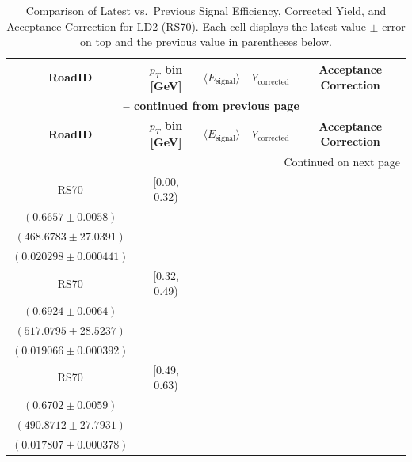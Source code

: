 {\footnotesize
\renewcommand{\arraystretch}{1.35}
\begin{longtable}{|c|c|c|c|c|}
\caption{Comparison of Latest vs.\ Previous Signal Efficiency, Corrected Yield, and Acceptance Correction for LD2 (RS70). Each cell displays the latest value $\pm$ error on top and the previous value in parentheses below.} \label{tab:eff_acc_comp_LD2_RS70} \\
\hline
\textbf{RoadID} & \textbf{$p_{T}$ bin [GeV]} & \textbf{$\langle E_{\mathrm{signal}} \rangle$} & \textbf{$Y_{\mathrm{corrected}}$} & \textbf{Acceptance Correction} \\
\hline
\endfirsthead
\multicolumn{5}{c}{{\bfseries \tablename\ \thetable{} -- continued from previous page}} \\
\hline
\textbf{RoadID} & \textbf{$p_{T}$ bin [GeV]} & \textbf{$\langle E_{\mathrm{signal}} \rangle$} & \textbf{$Y_{\mathrm{corrected}}$} & \textbf{Acceptance Correction} \\
\hline
\endhead
\hline \multicolumn{5}{|r|}{{Continued on next page}} \\ \hline
\endfoot
\hline
\endlastfoot
RS70 & [0.00, 0.32) & \begin{tabular}{@{}c@{}}$0.7050 \pm 0.0061$ \\ $(0.6657 \pm 0.0058)$\end{tabular} & \begin{tabular}{@{}c@{}}$442.5388 \pm 25.5311$ \\ $(468.6783 \pm 27.0391)$\end{tabular} & \begin{tabular}{@{}c@{}}$0.018640 \pm 0.000566$ \\ $(0.020298 \pm 0.000441)$\end{tabular} \\ \hline
RS70 & [0.32, 0.49) & \begin{tabular}{@{}c@{}}$0.7218 \pm 0.0061$ \\ $(0.6924 \pm 0.0064)$\end{tabular} & \begin{tabular}{@{}c@{}}$495.9520 \pm 27.3583$ \\ $(517.0795 \pm 28.5237)$\end{tabular} & \begin{tabular}{@{}c@{}}$0.018456 \pm 0.000511$ \\ $(0.019066 \pm 0.000392)$\end{tabular} \\ \hline
RS70 & [0.49, 0.63) & \begin{tabular}{@{}c@{}}$0.7085 \pm 0.0060$ \\ $(0.6702 \pm 0.0059)$\end{tabular} & \begin{tabular}{@{}c@{}}$464.3488 \pm 26.2914$ \\ $(490.8712 \pm 27.7931)$\end{tabular} & \begin{tabular}{@{}c@{}}$0.017477 \pm 0.000496$ \\ $(0.017807 \pm 0.000378)$\end{tabular} \\ \hline

\end{longtable}}

